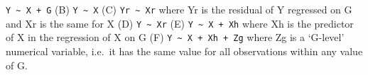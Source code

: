 \documentclass[
]{article}
\begin{document}
\begin{enumerate}
  \texttt{Y\ \textasciitilde{}\ X\ +\ G} \newline \null\quad (B)
  \texttt{Y\ \textasciitilde{}\ X} \newline \null\quad (C)
  \texttt{Yr\ \textasciitilde{}\ Xr} where Yr is the residual of Y
  regressed on G and Xr is the same for X \newline \null\quad (D)
  \texttt{Y\ \textasciitilde{}\ Xr} \newline \null\quad (E)
  \texttt{Y\ \textasciitilde{}\ X\ +\ Xh} where Xh is the predictor of X
  in the regression of X on G \newline \null\quad (F)
  \texttt{Y\ \textasciitilde{}\ X\ +\ Xh\ +\ Zg} where Zg is a `G-level'
  numerical variable, i.e.~it has the same value for all observations
  within any value of G. \newline \vspace{0px}
\end{enumerate}
\end{document}
